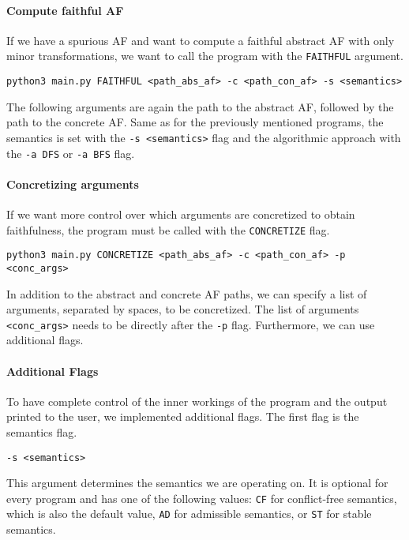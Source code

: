 \paragraph{Compute faithful AF} If we have a spurious AF and want to compute a faithful abstract AF with only minor transformations, we want to call the program with the \texttt{FAITHFUL} argument.

\begin{center}
    \texttt{python3 main.py FAITHFUL <path\_abs\_af> -c <path\_con\_af> -s <semantics>}
\end{center}

The following arguments are again the path to the abstract AF, followed by the path to the concrete AF. Same as for the previously mentioned programs, the semantics is set with the \texttt{-s <semantics>} flag and the algorithmic approach with the \texttt{-a DFS} or \texttt{-a BFS} flag.

\paragraph{Concretizing arguments} If we want more control over which arguments are concretized to obtain faithfulness, the program must be called with the \texttt{CONCRETIZE} flag.

\begin{center}
    \texttt{python3 main.py CONCRETIZE <path\_abs\_af> -c <path\_con\_af> -p <conc\_args>}
\end{center}

In addition to the abstract and concrete AF paths, we can specify a list of arguments, separated by spaces, to be concretized. The list of arguments \texttt{<conc\_args>} needs to be directly after the \texttt{-p} flag. Furthermore, we can use additional flags.

\paragraph{Additional Flags} To have complete control of the inner workings of the program and the output printed to the user, we implemented additional flags. The first flag is the semantics flag.

\begin{center}
    \texttt{-s <semantics>}
\end{center}

This argument determines the semantics we are operating on. It is optional for every program and has one of the following values: \texttt{CF} for conflict-free semantics, which is also the default value, \texttt{AD} for admissible semantics, or \texttt{ST} for stable semantics. 

